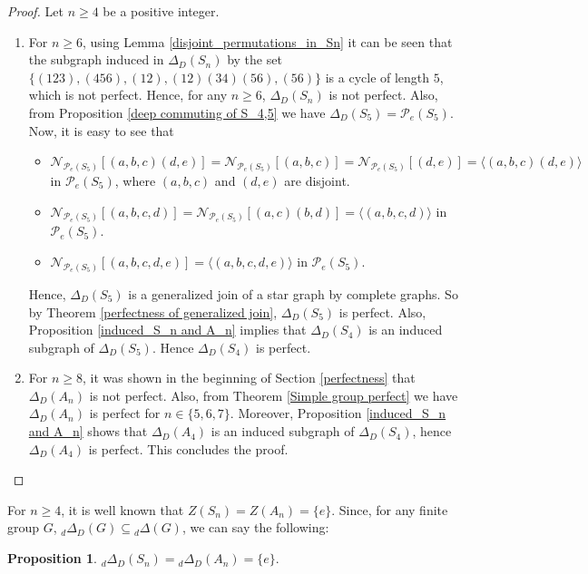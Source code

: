 \documentclass[12pt,a4paper]{article}
\newtheorem{proposition}[theorem]{Proposition}
\begin{document}
\begin{proof}
Let $n\geq 4$ be a positive integer. 
\begin{enumerate}[\rm (i)]
    \item For $n\geq 6$, using Lemma \ref{disjoint_permutations_in_Sn} it can be seen that the subgraph induced in $\Delta_D(S_n)$ by the set $\{(123),(456),(12),(12)(34)(56),(56)\}$ is a cycle of length $5$, which is not perfect. Hence, for any $n\geq 6$, $\Delta_D(S_n)$ is not perfect. Also, from Proposition \ref{deep commuting of S_4,5} we have $\Delta_D(S_5)=\mathcal{P}_e(S_5)$. Now, it is easy to see that 
    \begin{itemize}
        \item $\mathcal{N}_{\mathcal{P}_e(S_5)}[(a,b,c)(d,e)]=\mathcal{N}_{\mathcal{P}_e(S_5)}[(a,b,c)]=\mathcal{N}_{\mathcal{P}_e(S_5)}[(d,e)]=\langle(a,b,c)(d,e)\rangle$ in $\mathcal{P}_e(S_5)$, where $(a,b,c)$ and $(d,e)$ are disjoint.
        \item $\mathcal{N}_{\mathcal{P}_e(S_5)}[(a,b,c,d)]=\mathcal{N}_{\mathcal{P}_e(S_5)}[(a,c)(b,d)]=\langle(a,b,c,d)\rangle$ in $\mathcal{P}_e(S_5)$.
        \item $\mathcal{N}_{\mathcal{P}_e(S_5)}[(a,b,c,d,e)]=\langle(a,b,c,d,e)\rangle$ in $\mathcal{P}_e(S_5)$.
    \end{itemize}  
    Hence, $\Delta_D(S_5)$ is a generalized join of a star graph by complete graphs. So by Theorem \ref{perfectness of generalized join}, $\Delta_D(S_5)$ is perfect. Also, Proposition \ref{induced_S_n and A_n} implies that $\Delta_D(S_4)$ is an induced subgraph of $\Delta_D(S_5)$. Hence $\Delta_D(S_4)$ is perfect.
    
    \item For $n\geq 8$, it was shown in the beginning of Section \ref{perfectness} that $\Delta_D(A_n)$ is not perfect. Also, from Theorem \ref{Simple group perfect} we have $\Delta_D(A_n)$ is perfect for $n\in \{5,6,7\}$. Moreover, Proposition \ref{induced_S_n and A_n} shows that $\Delta_D(A_4)$ is an induced subgraph of $\Delta_D(S_4)$, hence $\Delta_D(A_4)$ is perfect. This concludes the proof.
\end{enumerate}
\end{proof}
For $n\geq 4$, it is well known that $Z(S_n)=Z(A_n)=\{e\}$. Since, for any finite group $G$, ${_d}\Delta_D(G)\subseteq {_d}\Delta(G)$, we can say the following: 
\begin{proposition}\label{Sn_An_dominant}
${_d}\Delta_D(S_n)={_d}\Delta_D(A_n)=\{e\}.$    
\end{proposition}
\end{document}
